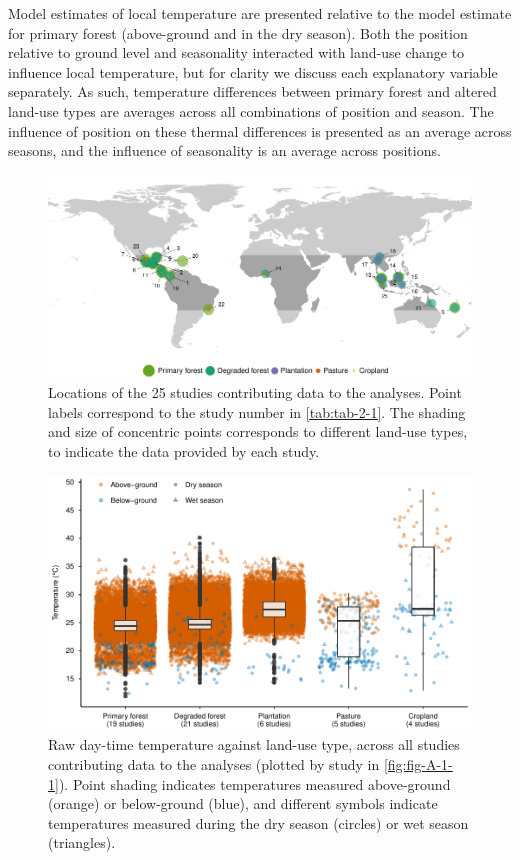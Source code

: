 \documentclass[12pt,a4paper,]{report}
\theoremstyle{definition}
\theoremstyle{definition}
\theoremstyle{definition}
\theoremstyle{remark}
\begin{document}
Model estimates of local temperature are presented relative to the model
estimate for primary forest (above-ground and in the dry season). Both
the position relative to ground level and seasonality interacted with
land-use change to influence local temperature, but for clarity we
discuss each explanatory variable separately. As such, temperature
differences between primary forest and altered land-use types are
averages across all combinations of position and season. The influence
of position on these thermal differences is presented as an average
across seasons, and the influence of seasonality is an average across
positions.

\begin{figure}
\includegraphics{./output/fig-2-1-1} \caption{Locations of the 25 studies contributing data to the analyses. Point labels correspond to the study number in \autoref{tab:tab-2-1}. The shading and size of concentric points corresponds to different land-use types, to indicate the data provided by each study.}\label{fig:fig-2-1}
\end{figure}

\begin{figure}
\centering
\includegraphics{figs/fig2.2.pdf}
\caption{\label{fig:fig-2-2}Raw day-time temperature against land-use type, across all studies contributing data to the analyses (plotted by study in \autoref{fig:fig-A-1-1}). Point shading indicates temperatures measured above-ground (orange) or below-ground (blue), and different symbols indicate temperatures measured during the dry season (circles) or wet season (triangles).}
\end{figure}
\end{document}
